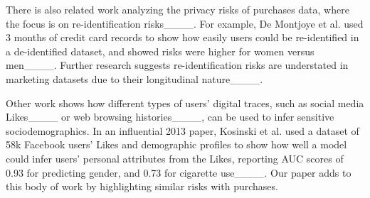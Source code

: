 There is also related work analyzing the privacy risks of purchases data, where the focus is on re-identification risks____.
For example, De Montjoye et al. used 3 months of credit card records to show how easily users could be re-identified in a de-identified dataset, and showed risks were higher for women versus men____. Further research suggests re-identification risks are understated in marketing datasets due to their longitudinal nature____.

Other work shows how different types of users' digital traces, such as social media Likes____ or web browsing histories____, can be used to infer sensitive sociodemographics. In an influential 2013 paper, Kosinski et al. used a dataset of 58k Facebook users' Likes and demographic profiles to show how well a model could infer users' personal attributes from the Likes, reporting AUC scores of 0.93 for predicting gender, and 0.73 for cigarette use____. Our paper adds to this body of work by highlighting similar risks with purchases.